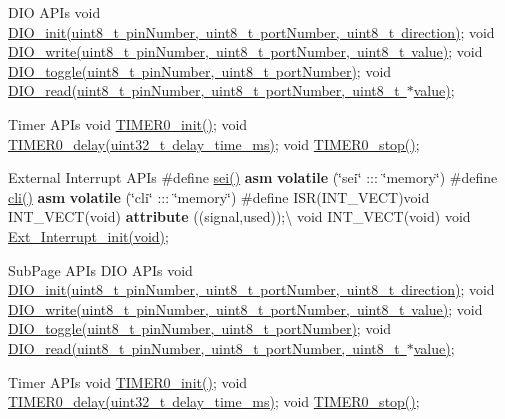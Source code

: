 DIO APIs void \mbox{\hyperlink{dio_8c_a2b95ae1ac8b1424a5b3965e67cb65acf}{DIO\+\_\+init(uint8\+\_\+t pin\+Number, uint8\+\_\+t port\+Number, uint8\+\_\+t direction)}}; void \mbox{\hyperlink{dio_8c_a11718630dcfe7aa5bcf8e79b2293845f}{DIO\+\_\+write(uint8\+\_\+t pin\+Number, uint8\+\_\+t port\+Number, uint8\+\_\+t value)}}; void \mbox{\hyperlink{dio_8c_a06934aa364ae60897e3035218b6fb637}{DIO\+\_\+toggle(uint8\+\_\+t pin\+Number, uint8\+\_\+t port\+Number)}}; void \mbox{\hyperlink{dio_8c_a69bf59de166e0c8ca6349e75f75efb08}{DIO\+\_\+read(uint8\+\_\+t pin\+Number, uint8\+\_\+t port\+Number, uint8\+\_\+t $\ast$value)}};

Timer APIs void \mbox{\hyperlink{timer_8c_aa94313b5d741dbccb192d9960411dfe8}{TIMER0\+\_\+init()}}; void \mbox{\hyperlink{timer_8c_ad26ddf94f57b0c5581d8d41b279417d3}{TIMER0\+\_\+delay(uint32\+\_\+t delay\+\_\+time\+\_\+ms)}}; void \mbox{\hyperlink{timer_8c_a1ddf6a77f5f7cb8b8aaea983b2d5c87f}{TIMER0\+\_\+stop()}};

External Interrupt APIs \#define \mbox{\hyperlink{external__interrupt_8h_aad5ebd34cb344c26ac87594f79b06b73}{sei()}} {\bfseries{asm}} {\bfseries{volatile}} (\char`\"{}sei\char`\"{} \+::\+: \char`\"{}memory\char`\"{}) \#define \mbox{\hyperlink{external__interrupt_8h_a68c330e94fe121eba993e5a5973c3162}{cli()}} {\bfseries{asm}} {\bfseries{volatile}} (\char`\"{}cli\char`\"{} \+::\+: \char`\"{}memory\char`\"{}) \#define ISR(\+INT\+\_\+\+VECT)void INT\+\_\+\+VECT(void) {\bfseries{attribute}} ((signal,used));\textbackslash{} void INT\+\_\+\+VECT(void) void \mbox{\hyperlink{external__interrupt_8c_a3dec38d0979b192185103ac2ac7e21a7}{Ext\+\_\+\+Interrupt\+\_\+init(void)}};

Sub\+Page API\textquotesingle{}s DIO APIs void \mbox{\hyperlink{dio_8c_a2b95ae1ac8b1424a5b3965e67cb65acf}{DIO\+\_\+init(uint8\+\_\+t pin\+Number, uint8\+\_\+t port\+Number, uint8\+\_\+t direction)}}; void \mbox{\hyperlink{dio_8c_a11718630dcfe7aa5bcf8e79b2293845f}{DIO\+\_\+write(uint8\+\_\+t pin\+Number, uint8\+\_\+t port\+Number, uint8\+\_\+t value)}}; void \mbox{\hyperlink{dio_8c_a06934aa364ae60897e3035218b6fb637}{DIO\+\_\+toggle(uint8\+\_\+t pin\+Number, uint8\+\_\+t port\+Number)}}; void \mbox{\hyperlink{dio_8c_a69bf59de166e0c8ca6349e75f75efb08}{DIO\+\_\+read(uint8\+\_\+t pin\+Number, uint8\+\_\+t port\+Number, uint8\+\_\+t $\ast$value)}};

Timer APIs void \mbox{\hyperlink{timer_8c_aa94313b5d741dbccb192d9960411dfe8}{TIMER0\+\_\+init()}}; void \mbox{\hyperlink{timer_8c_ad26ddf94f57b0c5581d8d41b279417d3}{TIMER0\+\_\+delay(uint32\+\_\+t delay\+\_\+time\+\_\+ms)}}; void \mbox{\hyperlink{timer_8c_a1ddf6a77f5f7cb8b8aaea983b2d5c87f}{TIMER0\+\_\+stop()}};

